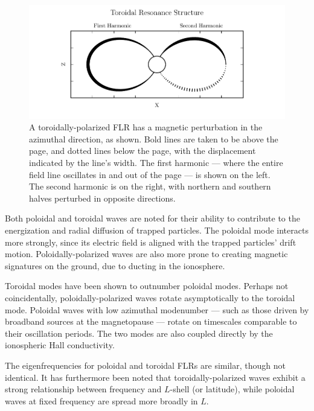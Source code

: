 \begin{figure}[!htb]
  \centering
  \includegraphics[width=\textwidth]{figures/toroidal.pdf}
  \caption[Toroidal Mode Structure]{
    A toroidally-polarized FLR has a magnetic perturbation in the azimuthal
    direction, as shown. Bold lines are taken to be above the page, and dotted
    lines below the page, with the displacement indicated by the line's width.
    The first harmonic --- where the entire field line oscillates in and out of
    the page --- is shown on the left. The second harmonic is on the right,
    with northern and southern halves perturbed in opposite directions. 
  }
  \label{fig_toroidal}
\end{figure}

Both poloidal and toroidal waves are noted for their ability to contribute to
the energization and radial diffusion of trapped particles. The poloidal mode
interacts more strongly, since its electric field is aligned with the trapped
particles' drift motion. Poloidally-polarized waves are also more prone to
creating magnetic signatures on the ground, due to ducting in the
ionosphere\cite{fujita_1988,greifinger_1968}. 

Toroidal modes have been shown to outnumber poloidal modes\cite{anderson_1990}.
Perhaps not coincidentally, poloidally-polarized waves rotate asymptotically to
the toroidal mode\cite{mann_1995,mann_1997,radoski_1974}. Poloidal waves with
low azimuthal modenumber --- such as those driven by broadband sources at the
magnetopause --- rotate on timescales comparable to their oscillation periods.
The two modes are also coupled directly by the ionospheric Hall
conductivity\cite{kato_1956}. 

The eigenfrequencies for poloidal and toroidal FLRs are similar, though not
identical\cite{green_1985}. It has furthermore been noted that
toroidally-polarized waves exhibit a strong relationship between frequency and
$L$-shell (or latitude), while poloidal waves at fixed frequency are spread
more broadly in $L$\cite{engebretson_1986}. 


